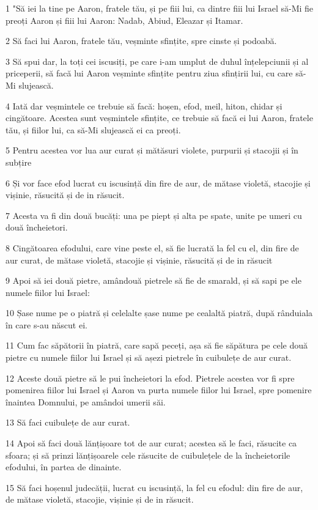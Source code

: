 \par 1 "Să iei la tine pe Aaron, fratele tău, și pe fiii lui, ca dintre fiii lui Israel să-Mi fie preoți Aaron și fiii lui Aaron: Nadab, Abiud, Eleazar și Itamar.
\par 2 Să faci lui Aaron, fratele tău, veșminte sfințite, spre cinste și podoabă.
\par 3 Să spui dar, la toți cei iscusiți, pe care i-am umplut de duhul înțelepciunii și al priceperii, să facă lui Aaron veșminte sfințite pentru ziua sfințirii lui, cu care să-Mi slujească.
\par 4 Iată dar veșmintele ce trebuie să facă: hoșen, efod, meil, hiton, chidar și cingătoare. Acestea sunt veșmintele sfințite, ce trebuie să facă ei lui Aaron, fratele tău, și fiilor lui, ca să-Mi slujească ei ca preoți.
\par 5 Pentru acestea vor lua aur curat și mătăsuri violete, purpurii și stacojii și în subțire
\par 6 Și vor face efod lucrat cu iscusință din fire de aur, de mătase violetă, stacojie și vișinie, răsucită și de in răsucit.
\par 7 Acesta va fi din două bucăți: una pe piept și alta pe spate, unite pe umeri cu două încheietori.
\par 8 Cingătoarea efodului, care vine peste el, să fie lucrată la fel cu el, din fire de aur curat, de mătase violetă, stacojie și vișinie, răsucită și de in răsucit
\par 9 Apoi să iei două pietre, amândouă pietrele să fie de smarald, și să sapi pe ele numele fiilor lui Israel:
\par 10 Șase nume pe o piatră și celelalte șase nume pe cealaltă piatră, după rânduiala în care s-au născut ei.
\par 11 Cum fac săpătorii în piatră, care sapă peceți, așa să fie săpătura pe cele două pietre cu numele fiilor lui Israel și să așezi pietrele în cuibulețe de aur curat.
\par 12 Aceste două pietre să le pui încheietori la efod. Pietrele acestea vor fi spre pomenirea fiilor lui Israel și Aaron va purta numele fiilor lui Israel, spre pomenire înaintea Domnului, pe amândoi umerii săi.
\par 13 Să faci cuibulețe de aur curat.
\par 14 Apoi să faci două lănțișoare tot de aur curat; acestea să le faci, răsucite ca sfoara; și să prinzi lănțișoarele cele răsucite de cuibulețele de la încheietorile efodului, în partea de dinainte.
\par 15 Să faci hoșenul judecății, lucrat cu iscusință, la fel cu efodul: din fire de aur, de mătase violetă, stacojie, vișinie și de in răsucit.

